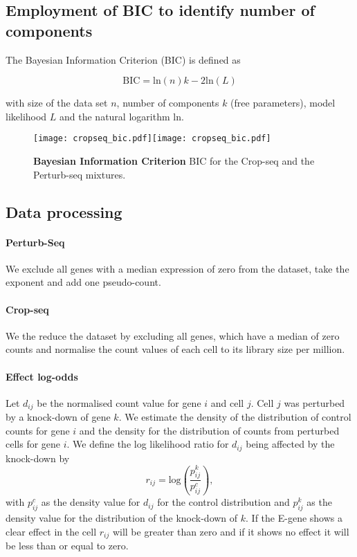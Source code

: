 \documentclass[12pt]{article}
\begin{document}
\subsection{Employment of BIC to identify number of components}

The Bayesian Information Criterion (BIC) is defined as

\begin{equation}
\mathrm{BIC} = \mathrm{ln}\left(n\right)k - 2\mathrm{ln}\left(L\right)
\end{equation}

with size of the data set $n$, number of components $k$ (free parameters), model likelihood $L$ and the natural logarithm $\mathrm{ln}$.

\begin{figure}
\texttt{[image: cropseq\_bic.pdf]}\texttt{[image: cropseq\_bic.pdf]}
\caption{\textbf{Bayesian Information Criterion} BIC for the Crop-seq and the Perturb-seq mixtures.}\label{fig:bics}
\end{figure}

\subsection{Data processing}

\paragraph{Perturb-Seq}
We exclude all genes with a median expression of zero from the dataset, take the exponent and add one pseudo-count.

\paragraph{Crop-seq}
We the reduce the dataset by excluding all genes, which have a median of zero counts and normalise the count values of each cell to its library size per million.

\paragraph{Effect log-odds}
Let $d_{ij}$ be the normalised count value for gene $i$ and cell $j$. Cell $j$  was perturbed by a knock-down of gene $k$. We estimate the density of the distribution of control counts for gene $i$ and the density for the distribution of counts from perturbed cells for gene $i$. We define the log likelihood ratio for $d_{ij}$ being affected by the knock-down by
\[r_{ij} = \mathrm{log} \left(\frac{p_{ij}^k}{p_{ij}^c}\right),\]
with $p_{ij}^c$ as the density value for $d_{ij}$ for the control distribution and $p_{ij}^k$ as the density value for the distribution of the knock-down of $k$. If the E-gene shows a clear effect in the cell $r_{ij}$ will be greater than zero and if it shows no effect it will be less than or equal to zero.
\end{document}
